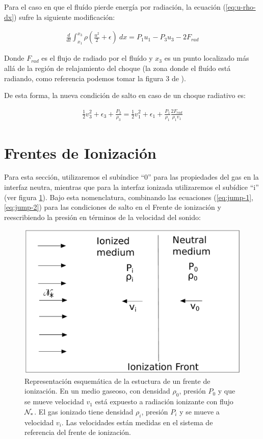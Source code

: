 Para el caso en que el fluído pierde energía por radiación, la ecuación (\ref{eq:u-rho-dx}) sufre la siguiente modificación:

\begin{align}
     \frac{d}{dt}\int^{x_3}_{x_1} \rho\left(\frac{u^2}{2} + \epsilon\right)~dx = P_1u_1 - P_3u_3 -2F_{rad}\label{eq:rho-u2-epsilon-dx-rad}
\end{align}

Donde $F_{rad}$ es el flujo de radiado por el fluído y $x_3$ es un punto localizado más allá de la región de relajamiento del choque (la zona donde el fluído está radiando, como referencia podemos tomar la figura 3 de \citet{Shull:1979}).

De esta forma, la nueva condición de salto en caso de un choque radiativo es:

\begin{align}
  \frac{1}{2}v^2_3 + \epsilon_3 + \frac{P_3}{\rho_3} = \frac{1}{2}v^2_1 + \epsilon_1 + \frac{P_1}{\rho_1} \frac{2F_{rad}}{\rho_1v_1}\label{eq:jump-rad}
\end{align}


\section{Frentes de Ionización}
Para esta sección, utilizaremos el subíndice ``0'' para las propiedades del gas en la interfaz neutra, mientras que para la interfaz ionizada utilizaremos el subídice ``i'' (ver figura \ref{fig:IF}). Bajo esta nomenclatura, combinando las ecuaciones (\ref{eq:jump-1}, \ref{eq:jump-2}) para las condiciones de salto en el Frente de ionización y reescribiendo la presión en términos de la velocidad del sonido:

\begin{figure}
  \includegraphics[width=0.8\linewidth]{./Figures/IF}
  \caption{Representación esquemática de la estuctura de un frente de ionización. En un medio gaseoso, con densidad $\rho_0$, presión $P_0$ y que se mueve velocidad $v_1$ está expuesto a radiación ionizante con flujo $\mathcal{N}_*$. El gas ionizado tiene densidad $\rho_i$, presión $P_i$ y se mueve a velocidad $v_i$. Las velocidades están medidas en el sistema de referencia del frente de ionización.}
  \label{fig:IF}
\end{figure}

